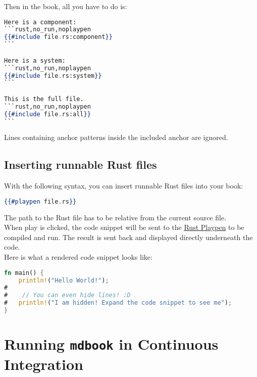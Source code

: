 \documentclass{article}
\begin{document}
Then in the book, all you have to do is:\\
\begin{lstlisting}[language=hbs]
Here is a component:
```rust,no_run,noplaypen
{{#include file.rs:component}}
```

Here is a system:
```rust,no_run,noplaypen
{{#include file.rs:system}}
```

This is the full file.
```rust,no_run,noplaypen
{{#include file.rs:all}}
```

\end{lstlisting}

Lines containing anchor patterns inside the included anchor are ignored.\\

\subsection{Inserting runnable Rust files}
\label{Inserting runnable Rust files}
\label{inserting-runnable-rust-files}

With the following syntax, you can insert runnable Rust files into your book:\\
\begin{lstlisting}[language=hbs]
{{#playpen file.rs}}

\end{lstlisting}

The path to the Rust file has to be relative from the current source file.\\

When play is clicked, the code snippet will be sent to the \href{https://play.rust-lang.org/}{Rust Playpen} to be
compiled and run. The result is sent back and displayed directly underneath the
code.\\

Here is what a rendered code snippet looks like:\\
\begin{lstlisting}[language=rust]
fn main() {
    println!("Hello World!");
#
#    // You can even hide lines! :D
#   println!("I am hidden! Expand the code snippet to see me");
}


\end{lstlisting}

\section{Running \lstinline|mdbook| in Continuous Integration}
\label{ in Continuous Integration}
\label{in-continuous-integration}
\end{document}
